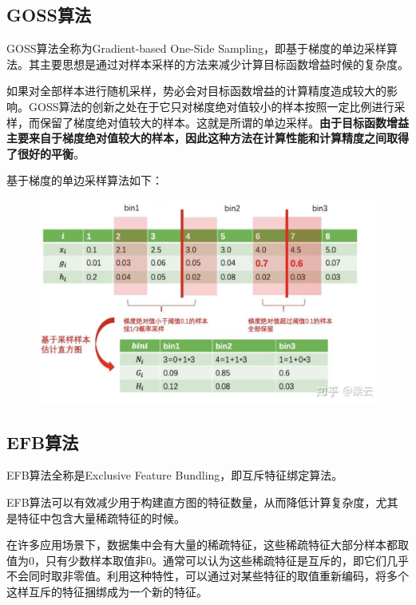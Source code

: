 \documentclass[12pt]{article}
\begin{document}
\subsection{GOSS算法}
GOSS算法全称为Gradient-based One-Side Sampling，即基于梯度的单边采样算法。其主要思想是通过对样本采样的方法来减少计算目标函数增益时候的复杂度。

如果对全部样本进行随机采样，势必会对目标函数增益的计算精度造成较大的影响。GOSS算法的创新之处在于它只对梯度绝对值较小的样本按照一定比例进行采样，而保留了梯度绝对值较大的样本。这就是所谓的单边采样。\textbf{由于目标函数增益主要来自于梯度绝对值较大的样本，因此这种方法在计算性能和计算精度之间取得了很好的平衡}。

基于梯度的单边采样算法如下：
\begin{figure}[H]
    \centering
    \includegraphics[width=1\textwidth]{fig/LightGBM_GOSS_Example.png}
\end{figure}

\subsection{EFB算法}
EFB算法全称是Exclusive Feature Bundling，即互斥特征绑定算法。

EFB算法可以有效减少用于构建直方图的特征数量，从而降低计算复杂度，尤其是特征中包含大量稀疏特征的时候。

在许多应用场景下，数据集中会有大量的稀疏特征，这些稀疏特征大部分样本都取值为0，只有少数样本取值非0。通常可以认为这些稀疏特征是互斥的，即它们几乎不会同时取非零值。利用这种特性，可以通过对某些特征的取值重新编码，将多个这样互斥的特征捆绑成为一个新的特征。
\end{document}
